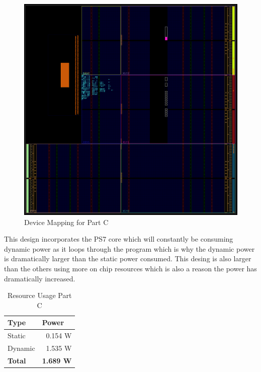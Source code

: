 \documentclass[letterpaper, 10 pt, conference]{IEEEconf}  %
\begin{document}
\begin{figure}[thpb]
   \centering
   \parbox{3in}{\centering\includegraphics[scale=0.35]{img/mp1c_device.PNG}}
   \caption{Device Mapping for Part C}
   \label{figurelabel}
\end{figure}

This design incorporates the PS7 core which will constantly be consuming dynamic power as it loops through the program which is why the dynamic power is dramatically larger than the static power consumed. This desing is also larger than the others using more on chip resources which is also a reason the power has dramatically increased.

\begin{table}[H]
\centering
\caption{Resource Usage Part C}
\label{table_example}
\begin{tabular}{|l|r|}
\hline
\rowcolor[HTML]{EFEFEF} 
Type    & \multicolumn{1}{l|}{\cellcolor[HTML]{EFEFEF}Power} \\ \hline
Static  & 0.154 W                                            \\ \hline
Dynamic & 1.535 W                                            \\ \hline
\textbf{Total} & \textbf{1.689 W}                            \\ \hline
\end{tabular}
\end{table}
\end{document}
